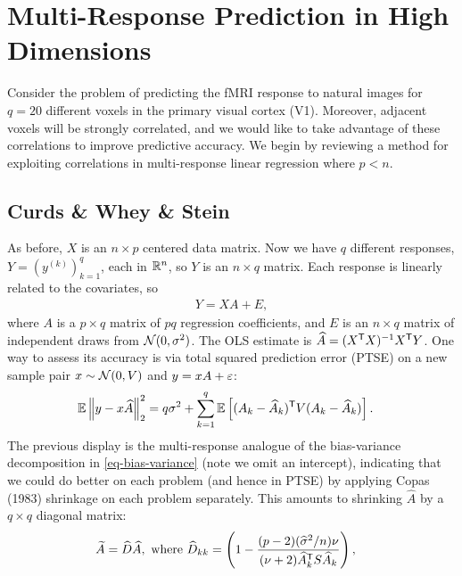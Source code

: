 \documentclass[main]{subfiles}
\begin{document}
\section{Multi-Response Prediction in High Dimensions}


Consider the problem of predicting the fMRI response to natural images for $q = 20$ different voxels in the primary visual cortex (V1). %
Moreover, adjacent voxels will be strongly correlated, and we would like to take advantage of these correlations to improve predictive accuracy. We begin by reviewing a method for exploiting correlations in multi-response linear regression where $p < n$.

\subsection{Curds \& Whey \& Stein}

As before, $X$ is an $n\times p$ centered data matrix. Now we have $q$ different responses, $Y = (y^{(k)})_{k=1}^q$, each in $\mathbb{R}^n$, so $Y$ is an $n\times q$ matrix. Each response is linearly related to the covariates, so
\begin{align}
Y = XA + E,
\end{align}
where $A$ is a $p\times q$ matrix of $pq$ regression coefficients, and $E$ is an $n\times q$ matrix of independent draws from $\mathcal{N}(0, \sigma^2)$. The OLS estimate is $\widehat{A} = (X^\mathsf T X)^{-1}X^\mathsf T Y$. One way to assess its accuracy is via total squared prediction error (PTSE) on a new sample pair $x\sim \mathcal{N}(0, V)$ and $y = xA+\varepsilon$:
\begin{align}
\mathbb{E}\left\| y - x\widehat{A}\right\|_2^2
\label{eq-multi-response-decomposition}
&= q\sigma^2 + \sum_{k=1}^q\mathbb{E}\left[(A_k - \widehat{A}_k)^\mathsf T V (A_k - \widehat{A}_k)\right].
\end{align}
The previous display is the multi-response analogue of the bias-variance decomposition in \eqref{eq-bias-variance} (note we omit an intercept), indicating that we could do better on each problem (and hence in PTSE) by applying Copas (1983) shrinkage on each problem separately. This amounts to shrinking $\widehat{A}$ by a $q\times q$ diagonal matrix:
\begin{align}
\widetilde{A}
&= \widehat{D} \widehat{A},
\text{ where }
\widehat{D}_{kk} = \left(1-\frac{(p-2)(\widehat\sigma^2/n)\nu}{(\nu+2)\widehat{A}_k^\mathsf T S\widehat{A}_k}\right),
\end{align}
\end{document}
